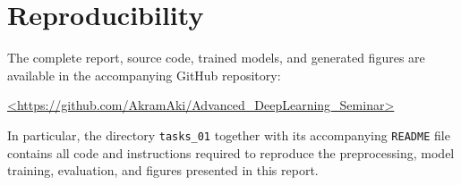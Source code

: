 \section{Reproducibility}
The complete report, source code, trained models, and generated figures are available in the accompanying GitHub repository:

\begin{center}
    \url{<https://github.com/AkramAki/Advanced_DeepLearning_Seminar>}
\end{center}

In particular, the directory \texttt{tasks\_01} together with its accompanying \texttt{README} file contains all code and instructions required to 
reproduce the preprocessing, model training, evaluation, and figures presented in this report.

\printbibliography

